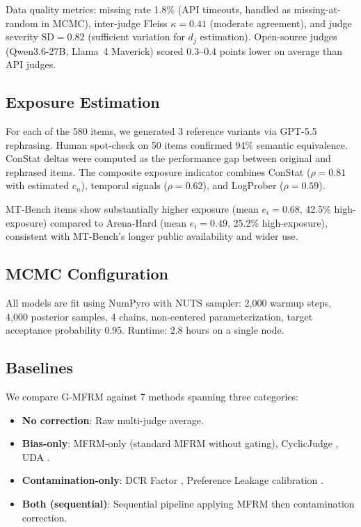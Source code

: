 \documentclass[11pt,a4paper]{article}
\begin{document}
Data quality metrics: missing rate 1.8\% (API timeouts, handled as missing-at-random in MCMC), inter-judge Fleiss $\kappa = 0.41$ (moderate agreement), and judge severity $\mathrm{SD} = 0.82$ (sufficient variation for $d_j$ estimation). Open-source judges (Qwen3.6-27B, Llama~4 Maverick) scored 0.3--0.4 points lower on average than API judges.

\subsection{Exposure Estimation}
\label{sec:exposure}

For each of the 580 items, we generated 3 reference variants via GPT-5.5 rephrasing. Human spot-check on 50 items confirmed 94\% semantic equivalence. ConStat deltas were computed as the performance gap between original and rephrased items. The composite exposure indicator combines ConStat ($\rho = 0.81$ with estimated $c_n$), temporal signals ($\rho = 0.62$), and LogProber ($\rho = 0.59$).

MT-Bench items show substantially higher exposure (mean $e_i = 0.68$, 42.5\% high-exposure) compared to Arena-Hard (mean $e_i = 0.49$, 25.2\% high-exposure), consistent with MT-Bench's longer public availability and wider use.

\subsection{MCMC Configuration}

All models are fit using NumPyro with NUTS sampler: 2,000 warmup steps, 4,000 posterior samples, 4 chains, non-centered parameterization, target acceptance probability 0.95. Runtime: 2.8 hours on a single node.

\subsection{Baselines}

We compare G-MFRM against 7 methods spanning three categories:

\begin{itemize}[nosep]
    \item \textbf{No correction}: Raw multi-judge average.
    \item \textbf{Bias-only}: MFRM-only (standard MFRM without gating), CyclicJudge \citep{lin2025cyclicjudge}, UDA \citep{li2024uda}.
    \item \textbf{Contamination-only}: DCR Factor \citep{yang2024dcr}, Preference Leakage calibration \citep{li2024preference}.
    \item \textbf{Both (sequential)}: Sequential pipeline applying MFRM then contamination correction.
\end{itemize}
\end{document}
